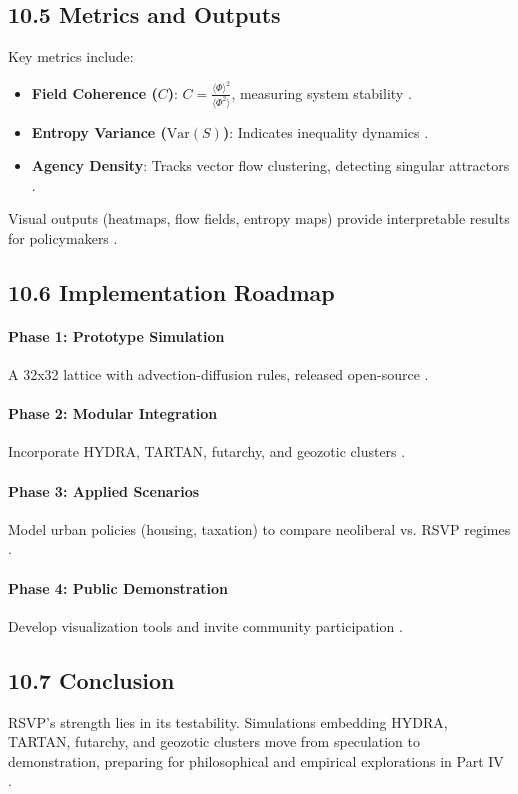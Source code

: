 \documentclass[12pt]{article}
\begin{document}
\subsection*{10.5 Metrics and Outputs}
Key metrics include:
\begin{itemize}
    \item \textbf{Field Coherence (\(C\))}: \(C = \frac{\langle \Phi \rangle^2}{\langle \Phi^2 \rangle}\), measuring system stability \citep{gromov1999}.
    \item \textbf{Entropy Variance (\(\mathrm{Var}(S)\))}: Indicates inequality dynamics \citep{shannon1948}.
    \item \textbf{Agency Density}: Tracks vector flow clustering, detecting singular attractors \citep{pearl2009}.
\end{itemize}
Visual outputs (heatmaps, flow fields, entropy maps) provide interpretable results for policymakers \citep{milewski2018}.
\subsection*{10.6 Implementation Roadmap}
\paragraph{Phase 1: Prototype Simulation}
A 32x32 lattice with advection-diffusion rules, released open-source \citep{bird1988}.
\paragraph{Phase 2: Modular Integration}
Incorporate HYDRA, TARTAN, futarchy, and geozotic clusters \citep{milewski2018}.
\paragraph{Phase 3: Applied Scenarios}
Model urban policies (housing, taxation) to compare neoliberal vs. RSVP regimes \citep{zuboff2019}.
\paragraph{Phase 4: Public Demonstration}
Develop visualization tools and invite community participation \citep{hanson2003}.
\subsection*{10.7 Conclusion}
RSVP's strength lies in its testability. Simulations embedding HYDRA, TARTAN, futarchy, and geozotic clusters move from speculation to demonstration, preparing for philosophical and empirical explorations in Part IV \citep{whitehead1978}.
\end{document}
